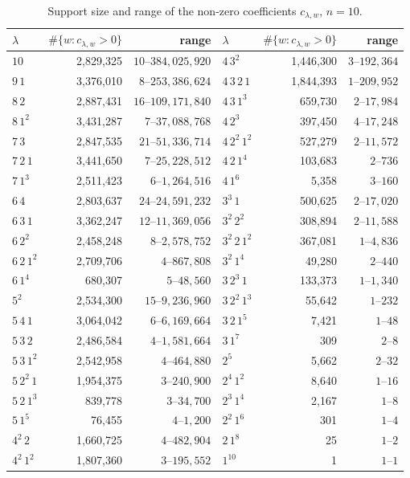 \documentclass[11pt]{amsart}
\theoremstyle{definition}
\theoremstyle{remark}
\begin{document}
\begin{table}[ht]
\small
\begin{tabular}{lrr@{\qquad}lrr}
\toprule
$\lambda$ & $\#\{w:c_{\lambda,w}>0\}$ & range & $\lambda$ & $\#\{w:c_{\lambda,w}>0\}$ & range\\
\midrule
$10$ & 2{,}829{,}325 & $10$--$384{,}025{,}920$ & $4\,3^{2}$ & 1{,}446{,}300 & $3$--$192{,}364$\\
$9\,1$ & 3{,}376{,}010 & $8$--$253{,}386{,}624$ & $4\,3\,2\,1$ & 1{,}844{,}393 & $1$--$209{,}952$\\
$8\,2$ & 2{,}887{,}431 & $16$--$109{,}171{,}840$ & $4\,3\,1^{3}$ & 659{,}730 & $2$--$17{,}984$\\
$8\,1^{2}$ & 3{,}431{,}287 & $7$--$37{,}088{,}768$ & $4\,2^{3}$ & 397{,}450 & $4$--$17{,}248$\\
$7\,3$ & 2{,}847{,}535 & $21$--$51{,}336{,}714$ & $4\,2^{2}\,1^{2}$ & 527{,}279 & $2$--$11{,}572$\\
$7\,2\,1$ & 3{,}441{,}650 & $7$--$25{,}228{,}512$ & $4\,2\,1^{4}$ & 103{,}683 & $2$--$736$\\
$7\,1^{3}$ & 2{,}511{,}423 & $6$--$1{,}264{,}516$ & $4\,1^{6}$ & 5{,}358 & $3$--$160$\\
$6\,4$ & 2{,}803{,}637 & $24$--$24{,}591{,}232$ & $3^{3}\,1$ & 500{,}625 & $2$--$17{,}020$\\
$6\,3\,1$ & 3{,}362{,}247 & $12$--$11{,}369{,}056$ & $3^{2}\,2^{2}$ & 308{,}894 & $2$--$11{,}588$\\
$6\,2^{2}$ & 2{,}458{,}248 & $8$--$2{,}578{,}752$ & $3^{2}\,2\,1^{2}$ & 367{,}081 & $1$--$4{,}836$\\
$6\,2\,1^{2}$ & 2{,}709{,}706 & $4$--$867{,}808$ & $3^{2}\,1^{4}$ & 49{,}280 & $2$--$440$\\
$6\,1^{4}$ & 680{,}307 & $5$--$48{,}560$ & $3\,2^{3}\,1$ & 133{,}373 & $1$--$1{,}340$\\
$5^{2}$ & 2{,}534{,}300 & $15$--$9{,}236{,}960$ & $3\,2^{2}\,1^{3}$ & 55{,}642 & $1$--$232$\\
$5\,4\,1$ & 3{,}064{,}042 & $6$--$6{,}169{,}664$ & $3\,2\,1^{5}$ & 7{,}421 & $1$--$48$\\
$5\,3\,2$ & 2{,}486{,}584 & $4$--$1{,}581{,}664$ & $3\,1^{7}$ & 309 & $2$--$8$\\
$5\,3\,1^{2}$ & 2{,}542{,}958 & $4$--$464{,}880$ & $2^{5}$ & 5{,}662 & $2$--$32$\\
$5\,2^{2}\,1$ & 1{,}954{,}375 & $3$--$240{,}900$ & $2^{4}\,1^{2}$ & 8{,}640 & $1$--$16$\\
$5\,2\,1^{3}$ & 839{,}778 & $3$--$34{,}700$ & $2^{3}\,1^{4}$ & 2{,}167 & $1$--$8$\\
$5\,1^{5}$ & 76{,}455 & $4$--$1{,}200$ & $2^{2}\,1^{6}$ & 301 & $1$--$4$\\
$4^{2}\,2$ & 1{,}660{,}725 & $4$--$482{,}904$ & $2\,1^{8}$ & 25 & $1$--$2$\\
$4^{2}\,1^{2}$ & 1{,}807{,}360 & $3$--$195{,}552$ & $1^{10}$ & 1 & $1$--$1$\\
\bottomrule
\end{tabular}
\caption{Support size and range of the non-zero coefficients $c_{\lambda,w}$, $n=10$.}\label{tab:n10}
\end{table}
\end{document}
